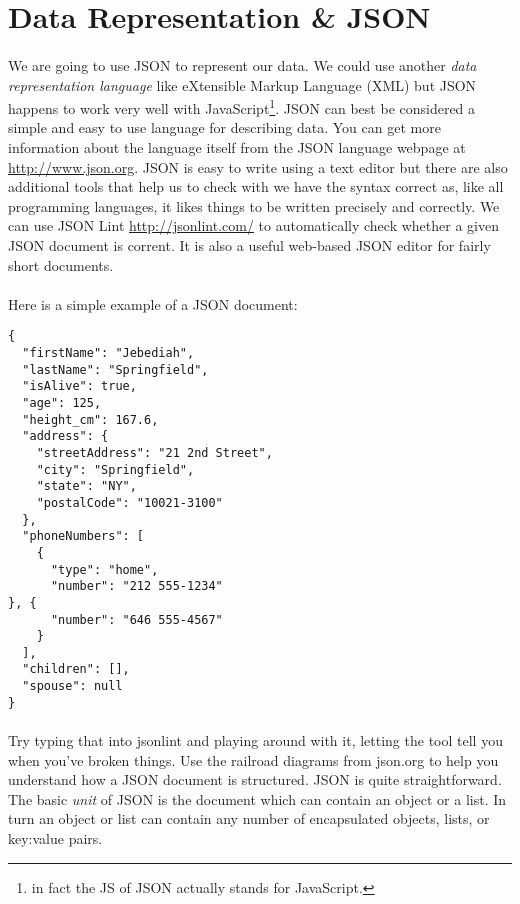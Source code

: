 \documentclass[10pt, a4paper, twosize]{article}
\begin{document}
\paragraph{} 

\section{Data Representation \& JSON}
\paragraph{} We are going to use JSON to represent our data. We could use another \emph{data representation language} like eXtensible Markup Language (XML) but JSON happens to work very well with JavaScript\footnote{in fact the JS of JSON actually stands for JavaScript.}. JSON can best be considered a simple and easy to use language for describing data. You can get more information about the language itself from the JSON language webpage at \url{http://www.json.org}. JSON is easy to write using a text editor but there are also additional tools that help us to check with we have the syntax correct as, like all programming languages, it likes things to be written precisely and correctly. We can use JSON Lint \url{http://jsonlint.com/} to automatically check whether a given JSON document is corrent. It is also a useful web-based JSON editor for fairly short documents.

\paragraph{} Here is a simple example of a JSON document:
\begin{lstlisting}
{
  "firstName": "Jebediah",
  "lastName": "Springfield",
  "isAlive": true,
  "age": 125,
  "height_cm": 167.6,
  "address": {
    "streetAddress": "21 2nd Street",
    "city": "Springfield",
    "state": "NY",
    "postalCode": "10021-3100"
  },
  "phoneNumbers": [
    {
      "type": "home",
      "number": "212 555-1234"
}, {
      "number": "646 555-4567"
    }
  ],
  "children": [],
  "spouse": null
}
\end{lstlisting}

\paragraph{} Try typing that into jsonlint and playing around with it, letting the tool tell you when you've broken things. Use the railroad diagrams from json.org to help you understand how a JSON document is structured. JSON is quite straightforward. The basic \emph{unit} of JSON is the document which can contain an object or a list. In turn an object or list can contain any number of encapsulated objects, lists, or key:value pairs.
\end{document}
